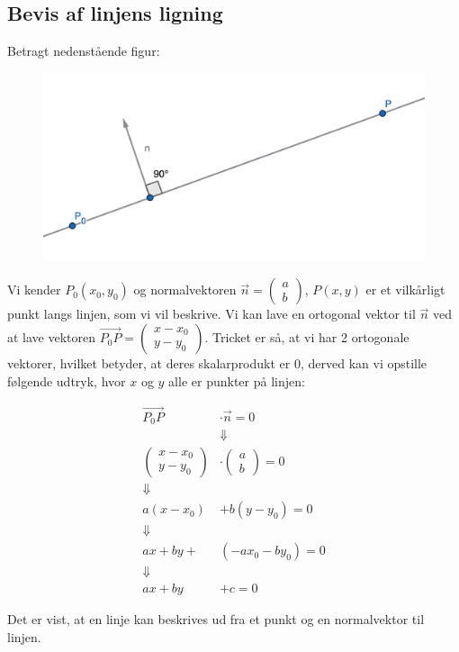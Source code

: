 \subsection{Bevis af linjens ligning}

\begin{proofw}
    Betragt nedenstående figur:
    \begin{figure}[h]
        \centering
        \includegraphics[scale=0.4]{skitser/linjens_ligning.png}
    \end{figure}

    Vi kender $P_0(x_0,y_0)$ og normalvektoren $\vec{n}=\begin{pmatrix}
        a \\ b
    \end{pmatrix}$, $P(x,y)$ er et vilkårligt punkt langs linjen, som vi vil beskrive.
    Vi kan lave en ortogonal vektor til $\vec{n}$ ved at lave vektoren $\vec{P_0P}=\begin{pmatrix}
        x-x_0
        \\
        y-y_0
    \end{pmatrix}$.
    Tricket er så, at vi har 2 ortogonale vektorer, hvilket betyder,
    at deres skalarprodukt er 0, derved kan vi opstille følgende udtryk, hvor $x$ og $y$ alle er punkter på linjen:

    \begin{align*}
        \vec{P_0P}&\cdot\vec{n}=0
        \\
        &\Downarrow
        \\
        \begin{pmatrix}
            x-x_0
            \\
            y-y_0
        \end{pmatrix}
        &\cdot
        \begin{pmatrix}
            a \\
            b
        \end{pmatrix}=0
        \\
        \Downarrow
        \\
        a(x-x_0)&+b(y-y_0)=0
        \\
        \Downarrow
        \\
        ax+by+&(-ax_0-by_0)=0
        \\
        \Downarrow
        \\
        ax+by&+c=0
    \end{align*}

    Det er vist, at en linje kan beskrives ud fra et punkt og en normalvektor til linjen.

\end{proofw}
